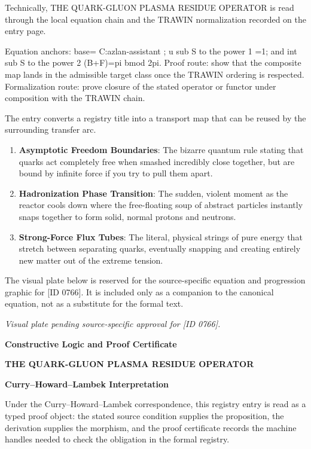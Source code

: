 Technically, THE QUARK-GLUON PLASMA RESIDUE OPERATOR is read through the local equation chain and the TRAWIN normalization recorded on the entry page.

Equation anchors: base= C:azlan-assistant ; u sub S to the power 1 =1; and int sub S to the power 2 (B+F)=pi bmod 2pi. Proof route: show that the composite map lands in the admissible target class once the TRAWIN ordering is respected. Formalization route: prove closure of the stated operator or functor under composition with the TRAWIN chain.

The entry converts a registry title into a transport map that can be reused by the surrounding transfer arc.
\endgroup

\begin{enumerate}[leftmargin=1.6em,itemsep=6pt,topsep=4pt]
\item \textbf{Asymptotic Freedom Boundaries}: The bizarre quantum rule stating that quarks act completely free when smashed incredibly close together, but are bound by infinite force if you try to pull them apart.
\item \textbf{Hadronization Phase Transition}: The sudden, violent moment as the reactor cools down where the free-floating soup of abstract particles instantly snaps together to form solid, normal protons and neutrons.
\item \textbf{Strong-Force Flux Tubes}: The literal, physical strings of pure energy that stretch between separating quarks, eventually snapping and creating entirely new matter out of the extreme tension.
\end{enumerate}

\begingroup\footnotesize\sloppy
The visual plate below is reserved for the source-specific equation and progression graphic for [ID 0766]. It is included only as a companion to the canonical equation, not as a substitute for the formal text.
\par\endgroup
\begingroup\footnotesize\itshape
Visual plate pending source-specific approval for [ID 0766].
\par\endgroup

\clearpage
\begingroup\tzpsupportsetup
\noindent\textbf{\fontsize{10.8pt}{12.8pt}\selectfont [ID 0766] Constructive Logic and Proof Certificate}\par
\noindent\textbf{\fontsize{10pt}{12pt}\selectfont THE QUARK-GLUON PLASMA RESIDUE OPERATOR}\par
\vspace{0.45em}
\begingroup
\footnotesize
\setlength{\parskip}{0.22em}
\setlength{\parindent}{0pt}
\noindent\textbf{Curry--Howard--Lambek Interpretation}\par
Under the Curry--Howard--Lambek correspondence, this registry entry is read as a typed proof
object: the stated source condition supplies the proposition, the derivation supplies the
morphism, and the proof certificate records the machine handles needed to check the obligation
in the formal registry.

